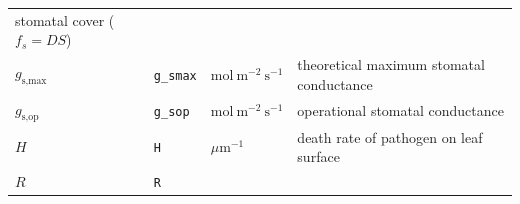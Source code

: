 \documentclass[utf8]{frontiersSCNS}
\begin{document}
\begin{longtable}[]{@{}llll@{}}
\begin{minipage}[t]{0.59\columnwidth}
stomatal cover (\(f_s = D S\))\strut
\end{minipage}\tabularnewline
\begin{minipage}[t]{0.09\columnwidth}\raggedright
\(g_\text{s,max}\)\strut
\end{minipage} & \begin{minipage}[t]{0.09\columnwidth}\raggedright
\texttt{g\_smax}\strut
\end{minipage} & \begin{minipage}[t]{0.11\columnwidth}\raggedright
\(\text{mol}~\text{m}^{-2}~\text{s}^{-1}\)\strut
\end{minipage} & \begin{minipage}[t]{0.59\columnwidth}\raggedright
theoretical maximum stomatal conductance\strut
\end{minipage}\tabularnewline
\begin{minipage}[t]{0.09\columnwidth}\raggedright
\(g_\text{s,op}\)\strut
\end{minipage} & \begin{minipage}[t]{0.09\columnwidth}\raggedright
\texttt{g\_sop}\strut
\end{minipage} & \begin{minipage}[t]{0.11\columnwidth}\raggedright
\(\text{mol}~\text{m}^{-2}~\text{s}^{-1}\)\strut
\end{minipage} & \begin{minipage}[t]{0.59\columnwidth}\raggedright
operational stomatal conductance\strut
\end{minipage}\tabularnewline
\begin{minipage}[t]{0.09\columnwidth}\raggedright
\(H\)\strut
\end{minipage} & \begin{minipage}[t]{0.09\columnwidth}\raggedright
\texttt{H}\strut
\end{minipage} & \begin{minipage}[t]{0.11\columnwidth}\raggedright
\(\mu\textrm{m} ^{-1}\)\strut
\end{minipage} & \begin{minipage}[t]{0.59\columnwidth}\raggedright
death rate of pathogen on leaf surface\strut
\end{minipage}\tabularnewline
\begin{minipage}[t]{0.09\columnwidth}\raggedright
\(R\)\strut
\end{minipage} & \begin{minipage}[t]{0.09\columnwidth}\raggedright
\texttt{R}\strut
\end{minipage} & \begin{minipage}[t]{0.11\columnwidth}\raggedright

\end{minipage}
\end{longtable}
\end{document}
